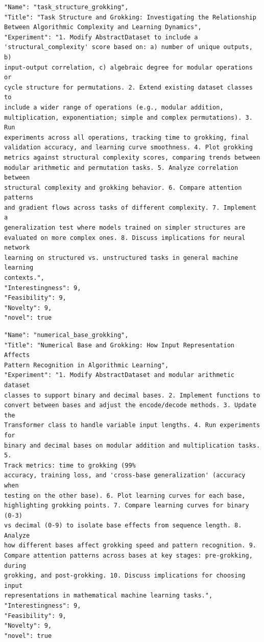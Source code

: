 \begin{tcolorbox}[breakable,colback=blue!5!white, colframe=blue!75!black, title=Idea 40/50 - \texttt{task\_structure\_grokking}]
\small
\begin{verbatim}
"Name": "task_structure_grokking",
"Title": "Task Structure and Grokking: Investigating the Relationship
Between Algorithmic Complexity and Learning Dynamics",
"Experiment": "1. Modify AbstractDataset to include a
'structural_complexity' score based on: a) number of unique outputs, b)
input-output correlation, c) algebraic degree for modular operations or
cycle structure for permutations. 2. Extend existing dataset classes to
include a wider range of operations (e.g., modular addition,
multiplication, exponentiation; simple and complex permutations). 3. Run
experiments across all operations, tracking time to grokking, final
validation accuracy, and learning curve smoothness. 4. Plot grokking
metrics against structural complexity scores, comparing trends between
modular arithmetic and permutation tasks. 5. Analyze correlation between
structural complexity and grokking behavior. 6. Compare attention patterns
and gradient flows across tasks of different complexity. 7. Implement a
generalization test where models trained on simpler structures are
evaluated on more complex ones. 8. Discuss implications for neural network
learning on structured vs. unstructured tasks in general machine learning
contexts.",
"Interestingness": 9,
"Feasibility": 9,
"Novelty": 9,
"novel": true
\end{verbatim}
\end{tcolorbox}

\begin{tcolorbox}[breakable,colback=blue!5!white, colframe=blue!75!black, title=Idea 41/50 - \texttt{numerical\_base\_grokking}]
\small
\begin{verbatim}
"Name": "numerical_base_grokking",
"Title": "Numerical Base and Grokking: How Input Representation Affects
Pattern Recognition in Algorithmic Learning",
"Experiment": "1. Modify AbstractDataset and modular arithmetic dataset
classes to support binary and decimal bases. 2. Implement functions to
convert between bases and adjust the encode/decode methods. 3. Update the
Transformer class to handle variable input lengths. 4. Run experiments for
binary and decimal bases on modular addition and multiplication tasks. 5.
Track metrics: time to grokking (99%
accuracy, training loss, and 'cross-base generalization' (accuracy when
testing on the other base). 6. Plot learning curves for each base,
highlighting grokking points. 7. Compare learning curves for binary (0-3)
vs decimal (0-9) to isolate base effects from sequence length. 8. Analyze
how different bases affect grokking speed and pattern recognition. 9.
Compare attention patterns across bases at key stages: pre-grokking, during
grokking, and post-grokking. 10. Discuss implications for choosing input
representations in mathematical machine learning tasks.",
"Interestingness": 9,
"Feasibility": 9,
"Novelty": 9,
"novel": true
\end{verbatim}
\end{tcolorbox}

